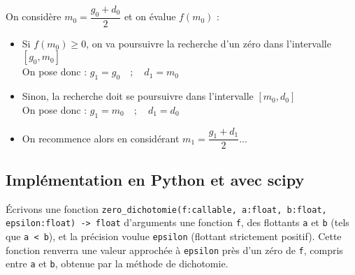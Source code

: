  On considère $m_0 = \dfrac{g_0+d_0}{2}$ et on évalue $f(m_0)$ : 
\begin{itemize}
 \item Si $f(m_0)\geq 0$, on va poursuivre la recherche d'un zéro dans l'intervalle  {$[g_0,m_0]$} \\On pose donc  : 
 $g_1 =  {g_0} \quad ;\quad  d_1 =  {m_0}$\vspace*{2mm}
  \item Sinon,  la recherche doit se poursuivre  dans l'intervalle  {$[m_0,d_0]$} \\ On pose donc  : 
 $g_1 =  {m_0} \quad ; \quad d_1 =  {d_0}$\vspace*{2mm}
 \item On recommence alors en considérant $m_1 = \dfrac{g_1+d_1}{2}$...\\
 \end{itemize}

%
%
%
% 
%
%


\subsection{Implémentation en Python et avec scipy}
\'Ecrivons une fonction \lstinline{zero_dichotomie(f:callable, a:float, b:float, epsilon:float) -> float} d'arguments une fonction \lstinline{f}, des flottants \lstinline{a} et \lstinline{b} (tels que \lstinline{a < b}), et  la précision voulue \lstinline{epsilon} (flottant strictement positif). Cette fonction renverra une valeur approchée à \lstinline{epsilon} près d'un zéro de \lstinline{f}, compris entre \lstinline{a} et \lstinline{b}, obtenue par la méthode de dichotomie.

